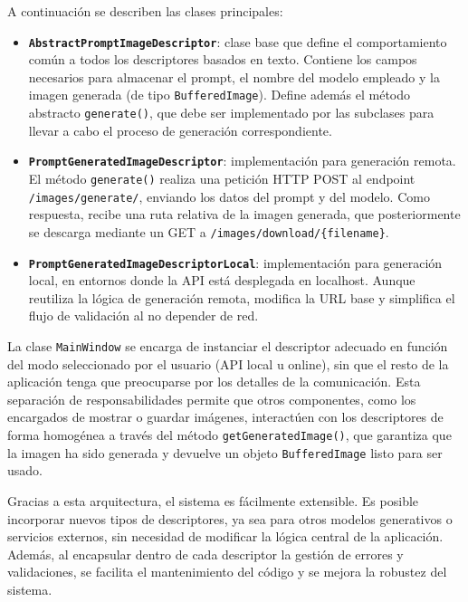 A continuación se describen las clases principales:

\begin{itemize}
    \item \textbf{\texttt{AbstractPromptImageDescriptor}}: clase base que define el comportamiento común a todos los descriptores basados en texto. Contiene los campos necesarios para almacenar el prompt, el nombre del modelo empleado y la imagen generada (de tipo \texttt{BufferedImage}). Define además el método abstracto \texttt{generate()}, que debe ser implementado por las subclases para llevar a cabo el proceso de generación correspondiente.

    \item \textbf{\texttt{PromptGeneratedImageDescriptor}}: implementación para generación remota. El método \texttt{generate()} realiza una petición HTTP POST al endpoint \texttt{/images/generate/}, enviando los datos del prompt y del modelo. Como respuesta, recibe una ruta relativa de la imagen generada, que posteriormente se descarga mediante un GET a \texttt{/images/download/\{filename\}}.

    \item \textbf{\texttt{PromptGeneratedImageDescriptorLocal}}: implementación para generación local, en entornos donde la API está desplegada en localhost. Aunque reutiliza la lógica de generación remota, modifica la URL base y simplifica el flujo de validación al no depender de red.
\end{itemize}

La clase \texttt{MainWindow} se encarga de instanciar el descriptor adecuado en función del modo seleccionado por el usuario (API local u online), sin que el resto de la aplicación tenga que preocuparse por los detalles de la comunicación. Esta separación de responsabilidades permite que otros componentes, como los encargados de mostrar o guardar imágenes, interactúen con los descriptores de forma homogénea a través del método \texttt{getGeneratedImage()}, que garantiza que la imagen ha sido generada y devuelve un objeto \texttt{BufferedImage} listo para ser usado.

Gracias a esta arquitectura, el sistema es fácilmente extensible. Es posible incorporar nuevos tipos de descriptores, ya sea para otros modelos generativos o servicios externos, sin necesidad de modificar la lógica central de la aplicación. Además, al encapsular dentro de cada descriptor la gestión de errores y validaciones, se facilita el mantenimiento del código y se mejora la robustez del sistema.
